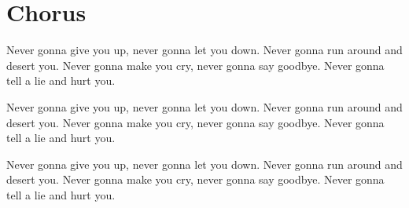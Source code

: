 \documentclass{article}
\begin{document}
\section{Chorus}

Never gonna give you up, never gonna let you down.
Never gonna run around and desert you.
Never gonna make you cry, never gonna say goodbye.
Never gonna tell a lie and hurt you.

Never gonna give you up, never gonna let you down.
Never gonna run around and desert you.
Never gonna make you cry, never gonna say goodbye.
Never gonna tell a lie and hurt you.

Never gonna give you up, never gonna let you down.
Never gonna run around and desert you.
Never gonna make you cry, never gonna say goodbye.
Never gonna tell a lie and hurt you.
\end{document}
